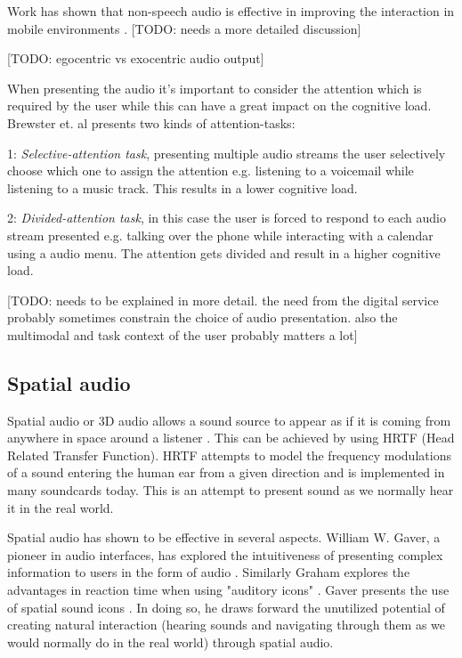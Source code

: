 Work has shown that non-speech audio is effective in improving the interaction in mobile environments \cite{pirhonen_gestural_2002, sawhney_nomadic_2000}. [TODO: needs a more detailed discussion]

[TODO: egocentric vs exocentric audio output]

When presenting the audio it's important to consider the attention which is required by the user while this can have a great impact on the cognitive load. Brewster et. al \cite{vazquez-alvarez_eyes-free_2011} presents two kinds of attention-tasks:

\begin{description}
\item{1: \textit{Selective-attention task}}, presenting multiple audio streams the user selectively choose which one to assign the attention e.g. listening to a voicemail while listening to a music track. This results in a lower cognitive load.

\item{2: \textit{Divided-attention task}}, in this case the user is forced to respond to each audio stream presented e.g. talking over the phone while interacting with a calendar using a audio menu. The attention gets divided and result in a higher cognitive load.
\end{description}

[TODO: needs to be explained in more detail. the need from the digital service probably sometimes constrain the choice of audio presentation. also the multimodal and task context of the user probably matters a lot]


\subsection{Spatial audio}
Spatial audio or 3D audio allows a sound source to appear as if it is coming from anywhere in space around a listener \cite{begault_3dd_1994}. This can be achieved by using HRTF (Head Related Transfer Function). HRTF attempts to model the frequency modulations of a sound entering the human ear from a given direction and is implemented in many soundcards today. This is an attempt to present sound as we normally hear it in the real world.

Spatial audio has shown to be effective in several aspects. William W. Gaver, a pioneer in audio interfaces, has explored the intuitiveness of presenting complex information to users in the form of audio \cite{gaver_sonicfinder:_1989}. Similarly Graham explores the advantages in reaction time when using "auditory icons" \cite{graham_use_1999}. Gaver presents the use of spatial sound icons \cite{gaver_auditory_1986}. In doing so, he draws forward the unutilized potential of creating natural interaction (hearing sounds and navigating through them as we would normally do in the real world) through spatial audio.

